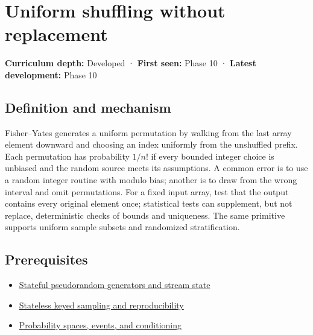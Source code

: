 \hypertarget{appendix-184fcc411663}{}\label{referencestart:appendix-184fcc411663}
\section{Uniform shuffling without replacement}\label{appendix-184fcc411663-uniform-shuffling-without-replacement}

\hypertarget{appendix-184fcc411663-uniform-shuffling-without-replacement}{}

\textbf{Curriculum depth:} Developed · \textbf{First seen:} Phase 10 · \textbf{Latest development:} Phase 10

\begin{allmightroledefinition}

\subsection{Definition and mechanism}\label{appendix-184fcc411663-definition-and-mechanism}

\hypertarget{appendix-184fcc411663-definition-and-mechanism}{}

Fisher--Yates generates a uniform permutation by walking from the last array element downward and choosing an index uniformly from the unshuffled prefix. Each permutation has probability \(1/n!\) if every bounded integer choice is unbiased and the random source meets its assumptions. A common error is to use a random integer routine with modulo bias; another is to draw from the wrong interval and omit permutations. For a fixed input array, test that the output contains every original element once; statistical tests can supplement, but not replace, deterministic checks of bounds and uniqueness. The same primitive supports uniform sample subsets and randomized stratification.

\end{allmightroledefinition}

\subsection{Prerequisites}\label{appendix-184fcc411663-prerequisites}

\hypertarget{appendix-184fcc411663-prerequisites}{}

\begin{itemize}
\tightlist
\item
  \hyperref[appendix-e0f7c7e08f3a]{Stateful pseudorandom generators and stream state}
\item
  \hyperref[appendix-daaf25bfd3a0]{Stateless keyed sampling and reproducibility}
\item
  \hyperref[appendix-f1ef323f6ed7]{Probability spaces, events, and conditioning}
\end{itemize}

